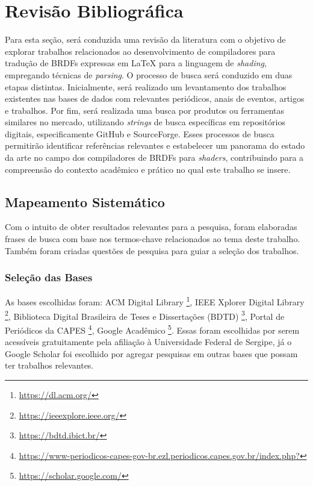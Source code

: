 
\chapter{Revisão Bibliográfica} \label{revisao}


Para esta seção, será conduzida uma revisão da literatura com o objetivo de explorar trabalhos relacionados ao desenvolvimento de compiladores para tradução de BRDFs expressas em \LaTeX{} para a linguagem de \textit{shading}, empregando técnicas de \textit{parsing}. O processo de busca será conduzido em duas etapas distintas. Inicialmente, será realizado um levantamento dos trabalhos existentes nas bases de dados  com relevantes periódicos, anais de eventos, artigos e trabalhos. Por fim, será realizada uma busca por produtos ou ferramentas similares no mercado, utilizando \textit{strings} de busca específicas em repositórios digitais, especificamente GitHub e SourceForge. Esses processos de busca permitirão identificar referências relevantes e estabelecer um panorama do estado da arte no campo dos compiladores de BRDFs  para \textit{shaders}, contribuindo para a compreensão do contexto acadêmico e prático no qual este trabalho se insere.


\section{Mapeamento Sistemático}


Com o intuito de obter resultados relevantes para a pesquisa, foram elaboradas frases de busca com base nos termos-chave relacionados ao tema deste trabalho. Também foram criadas questões de pesquisa para guiar a seleção dos trabalhos.


\subsection{Seleção das Bases}
As bases escolhidas foram: ACM Digital Library \footnote{\url{https://dl.acm.org/}},  IEEE Xplorer Digital Library \footnote{\url{https://ieeexplore.ieee.org/}},  Biblioteca Digital Brasileira de Teses e Dissertações (BDTD) \footnote{\url{https://bdtd.ibict.br/}}, Portal de Periódicos da CAPES \footnote{\url{https://www-periodicos-capes-gov-br.ezl.periodicos.capes.gov.br/index.php?}},  Google Acadêmico \footnote{\url{https://scholar.google.com/}}. Essas foram escolhidas por serem acessíveis gratuitamente pela afiliação à Universidade Federal de Sergipe, já o Google Scholar foi escolhido por agregar pesquisas em outras bases que possam ter trabalhos relevantes.


